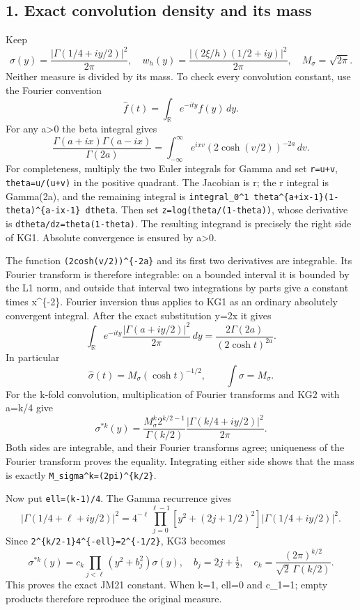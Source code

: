 \subsection{1. Exact convolution density and its mass}\label{mrkg:exact-convolution-density-and-its-mass}

Keep \[
\sigma(y)=\frac{|\Gamma(1/4+iy/2)|^2}{2\pi},\quad
w_h(y)=\frac{|(2\xi/h)(1/2+iy)|^2}{2\pi},\quad
M_\sigma=\sqrt{2\pi}.
\] Neither measure is divided by its mass. To check every convolution constant, use the Fourier convention \[
\widehat f(t)=\int_{\mathbb R}e^{-ity}f(y)\,dy.
\] For any a\textgreater0 the beta integral gives \[
\frac{\Gamma(a+ix)\Gamma(a-ix)}{\Gamma(2a)}
=\int_{-\infty}^{\infty}e^{ixv}(2\cosh(v/2))^{-2a}\,dv.
\tag{KG1}
\] For completeness, multiply the two Euler integrals for Gamma and set \texttt{r=u+v}, \texttt{theta=u/(u+v)} in the positive quadrant. The Jacobian is r; the r integral is Gamma(2a), and the remaining integral is \texttt{integral\_0\^{}1\ theta\^{}\{a+ix-1\}(1-theta)\^{}\{a-ix-1\}\ dtheta}. Then set \texttt{z=log(theta/(1-theta))}, whose derivative is \texttt{dtheta/dz=theta(1-theta)}. The resulting integrand is precisely the right side of KG1. Absolute convergence is ensured by a\textgreater0.

The function \texttt{(2cosh(v/2))\^{}\{-2a\}} and its first two derivatives are integrable. Its Fourier transform is therefore integrable: on a bounded interval it is bounded by the L1 norm, and outside that interval two integrations by parts give a constant times \textbar x\textbar\^{}\{-2\}. Fourier inversion thus applies to KG1 as an ordinary absolutely convergent integral. After the exact substitution y=2x it gives \[
\int_{\mathbb R}e^{-ity}
\frac{|\Gamma(a+iy/2)|^2}{2\pi}\,dy
=\frac{2\Gamma(2a)}{(2\cosh t)^{2a}}.
\tag{KG2}
\] In particular \[
\widehat\sigma(t)=M_\sigma(\cosh t)^{-1/2},\qquad
\int\sigma=M_\sigma.
\] For the k-fold convolution, multiplication of Fourier transforms and KG2 with a=k/4 give \[
\sigma^{*k}(y)=
\frac{M_\sigma^k2^{k/2-1}}{\Gamma(k/2)}
\frac{|\Gamma(k/4+iy/2)|^2}{2\pi}.
\tag{KG3}
\] Both sides are integrable, and their Fourier transforms agree; uniqueness of the Fourier transform proves the equality. Integrating either side shows that the mass is exactly \texttt{M\_sigma\^{}k=(2pi)\^{}\{k/2\}}.

Now put \texttt{ell=(k-1)/4}. The Gamma recurrence gives \[
|\Gamma(1/4+\ell+iy/2)|^2
=4^{-\ell}\prod_{j=0}^{\ell-1}
 \left[y^2+(2j+1/2)^2\right]|\Gamma(1/4+iy/2)|^2.
\] Since \texttt{2\^{}\{k/2-1\}4\^{}\{-ell\}=2\^{}\{-1/2\}}, KG3 becomes \[
\boxed{\sigma^{*k}(y)=c_k\prod_{j<\ell}(y^2+b_j^2)\sigma(y),
\quad b_j=2j+\tfrac12,\quad
c_k=\frac{(2\pi)^{k/2}}{\sqrt2\,\Gamma(k/2)}.}
\tag{KG4}
\] This proves the exact JM21 constant. When k=1, ell=0 and c\_1=1; empty products therefore reproduce the original measure.

